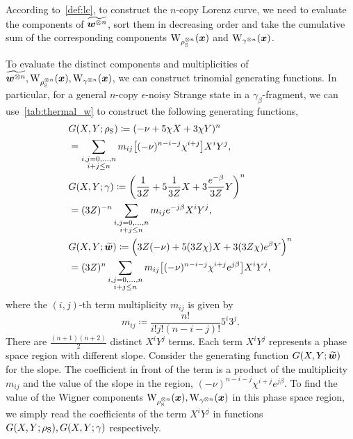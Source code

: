 \documentclass[pra,
aps,
twocolumn,
superscriptaddress,
groupedaddress,
nofootinbib,
reprint
]{revtex4-1}
\begin{document}
According to~\cref{def:lc}, to construct the $n$-copy Lorenz curve, we need to evaluate the components of $\widetilde{\bm{w}^{\otimes n}}$, sort them in decreasing order and take the cumulative sum of the corresponding components $\W{\noisys\too{n}}(\bmx)$ and $\W{\gamma\too{n}}(\bmx)$.

To evaluate the distinct components and multiplicities of $\widetilde{\bmw\too{n}}, \W{\noisys\too{n}}(\bmx), \W{\gamma\too{n}}(\bmx)$, we can construct trinomial generating functions.
In particular, for a general $n$-copy $\epsilon$-noisy Strange state in a $\gamma_\beta$-fragment, we can use~\cref{tab:thermal_w} to construct the following generating functions,
\begin{align}
	&G(X,Y; \rho_{\rm{S}}) \coloneqq (-\nu + 5\chi X + 3\chi Y)^n \nonumber\\
	&= \sum\limits_{\substack{i,j = 0,\dots,n \\ i+j \leq n}} m_{ij} \big[(-\nu)^{n-i-j} \chi^{i+j} \big] X^i Y^j, \\
	&G(X,Y; \gamma) \coloneqq \left( \frac{1}{3Z} + 5\frac{1}{3Z} X + 3 \frac{e^{-\beta}}{3Z} Y \right)^n \nonumber\\
	&= (3Z)^{-n} \sum\limits_{\substack{i,j = 0,\dots,n \\ i+j \leq n}} m_{ij} e^{-j\beta} X^i Y^j, \\
	&G(X,Y; \widetilde{\bm{w}}) \coloneqq \Big( 3Z(-\nu) + 5(3Z\chi) X + 3(3Z\chi) e^\beta Y \Big)^n \nonumber\\
	&= (3Z)^n \sum\limits_{\substack{i,j = 0,\dots,n \\ i+j \leq n}} m_{ij} \big[(-\nu)^{n-i-j} \chi^{i+j} e^{j\beta} \big] X^i Y^j,
\end{align}
where the $(i,j)$-th term multiplicity $m_{ij}$ is given by
\begin{equation}
	m_{ij} \coloneqq \frac{n!}{i!j!(n-i-j)!} 5^i 3^j.
\end{equation}
There are $\frac{(n+1)(n+2)}{2}$ distinct $X^i Y^j$ terms. 
Each term $X^i Y^j$ represents a phase space region with different slope. 
Consider the generating function $G(X,Y;\widetilde{\bm{w}})$ for the slope. 
The coefficient in front of the term is a product of the multiplicity $m_{ij}$ and the value of the slope in the region, $(-\nu)^{n-i-j} \chi^{i+j} e^{j\beta}$.
To find the value of the Wigner components $\W{\noisys\too{n}}(\bmx), \W{\gamma\too{n}}(\bmx)$ in this phase space region, we simply read the coefficients of the term $X^i Y^j$ in functions $G(X,Y; \rho_{\rm{S}}), G(X,Y; \gamma)$ respectively.
\end{document}
